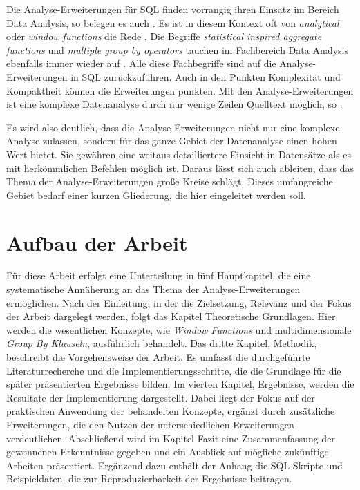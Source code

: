 Die Analyse-Erweiterungen für SQL finden vorrangig ihren Einsatz im Bereich Data
Analysis, so belegen es auch \citet[Kapitel 3]{FOTACHE2015243}. Es ist in diesem
Kontext oft von \textit{analytical} oder \textit{window functions} die Rede \citep[vgl.][Kapitel
3]{FOTACHE2015243}. Die Begriffe \textit{statistical inspired aggregate
functions} und \textit{multiple group by operators} tauchen im Fachbereich Data
Analysis ebenfalls immer wieder auf \citep[vgl.][Kapitel 4.3]{FOTACHE2015243}. Alle
diese Fachbegriffe sind auf die Analyse-Erweiterungen in SQL zurückzuführen.
Auch in den Punkten Komplexität und Kompaktheit können die Erweiterungen punkten.
Mit den Analyse-Erweiterungen ist eine komplexe Datenanalyse durch nur wenige Zeilen
Quelltext möglich, so \citet[vgl.][]{Maue2022}.

Es wird also deutlich, dass die Analyse-Erweiterungen nicht nur eine komplexe
Analyse zulassen, sondern für das ganze Gebiet der Datenanalyse einen hohen Wert
bietet. Sie gewähren eine weitaus detailliertere Einsicht in Datensätze als es
mit herkömmlichen Befehlen möglich ist. Daraus lässt sich auch ableiten, dass
das Thema der Analyse-Erweiterungen große Kreise schlägt. Dieses umfangreiche Gebiet
bedarf einer kurzen Gliederung, die hier eingeleitet werden soll.

\section{Aufbau der Arbeit}
\label{sec:aufbau_der_arbeit} Für diese Arbeit erfolgt eine Unterteilung in fünf
Hauptkapitel, die eine systematische Annäherung an das Thema der Analyse-Erweiterungen
ermöglichen. Nach der Einleitung, in der die Zielsetzung, Relevanz und der Fokus
der Arbeit dargelegt werden, folgt das Kapitel Theoretische Grundlagen. Hier
werden die wesentlichen Konzepte, wie \textit{Window Functions} und
multidimensionale \textit{Group By Klauseln}, ausführlich behandelt. Das dritte Kapitel,
Methodik, beschreibt die Vorgehensweise der Arbeit. Es umfasst die durchgeführte
Literaturrecherche und die Implementierungsschritte, die die Grundlage für die später
präsentierten Ergebnisse bilden. Im vierten Kapitel, Ergebnisse, werden die
Resultate der Implementierung dargestellt. Dabei liegt der Fokus auf der praktischen
Anwendung der behandelten Konzepte, ergänzt durch zusätzliche Erweiterungen, die
den Nutzen der unterschiedlichen Erweiterungen verdeutlichen. Abschließend wird
im Kapitel Fazit eine Zusammenfassung der gewonnenen Erkenntnisse gegeben und
ein Ausblick auf mögliche zukünftige Arbeiten präsentiert. Ergänzend dazu enthält
der Anhang die SQL-Skripte und Beispieldaten, die zur Reproduzierbarkeit der
Ergebnisse beitragen.

